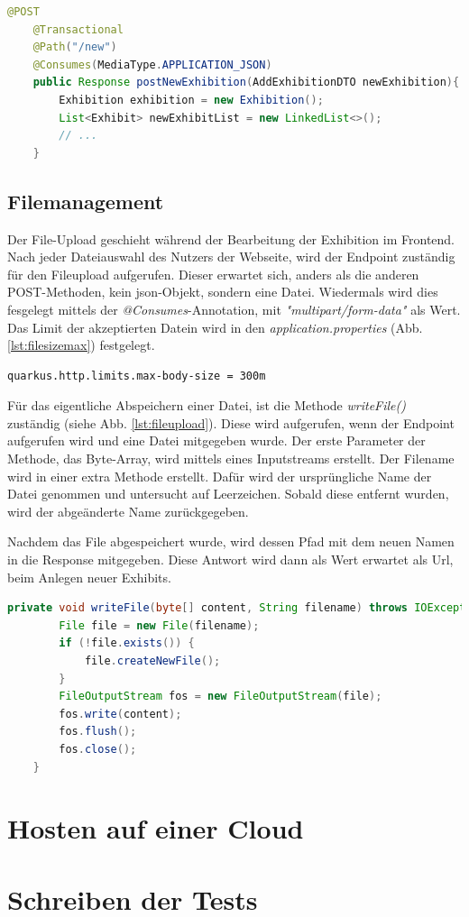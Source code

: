 \begin{lstlisting}[label=lst:newExhibitionMethod, language=Java, caption=Methode zum Anlegen von Exhibitions]
    @POST
    @Transactional
    @Path("/new")
    @Consumes(MediaType.APPLICATION_JSON)
    public Response postNewExhibition(AddExhibitionDTO newExhibition){
        Exhibition exhibition = new Exhibition();
        List<Exhibit> newExhibitList = new LinkedList<>();
        // ...
    }
\end{lstlisting}

\subsection{Filemanagement}
Der File-Upload geschieht während der Bearbeitung der Exhibition im Frontend. 
Nach jeder Dateiauswahl des Nutzers der Webseite, wird der Endpoint zuständig für den Fileupload aufgerufen. 
Dieser erwartet sich, anders als die anderen POST-Methoden, kein \gls{json}-Objekt, sondern eine Datei. 
Wiedermals wird dies fesgelegt mittels der \emph{@Consumes}-Annotation, mit \emph{"multipart/form-data"} als Wert. 
Das Limit der akzeptierten Datein wird in den \emph{application.properties} (Abb. \ref{lst:filesizemax}) festgelegt. 
\begin{lstlisting}[label=lst:filesizemax]
    quarkus.http.limits.max-body-size = 300m
\end{lstlisting}

Für das eigentliche Abspeichern einer Datei, ist die Methode \emph{writeFile()} zuständig (siehe Abb. \ref{lst:fileupload}). 
Diese wird aufgerufen, wenn der Endpoint aufgerufen wird und eine Datei mitgegeben wurde. 
Der erste Parameter der Methode, das Byte-Array, wird mittels eines Inputstreams erstellt. 
Der Filename wird in einer extra Methode erstellt. 
Dafür wird der ursprüngliche Name der Datei genommen und untersucht auf Leerzeichen. 
Sobald diese entfernt wurden, wird der abgeänderte Name zurückgegeben. 

Nachdem das File abgespeichert wurde, wird dessen Pfad mit dem neuen Namen in die Response mitgegeben. 
Diese Antwort wird dann als Wert erwartet als Url, beim Anlegen neuer Exhibits. 


\begin{lstlisting}[label=lst:fileupload, language=Java, caption=Hochladen der Dateien]
    private void writeFile(byte[] content, String filename) throws IOException {
        File file = new File(filename);
        if (!file.exists()) {
            file.createNewFile();
        }
        FileOutputStream fos = new FileOutputStream(file);
        fos.write(content);
        fos.flush();
        fos.close();
    }
\end{lstlisting}



\section{Hosten auf einer Cloud}

\section{Schreiben der Tests}